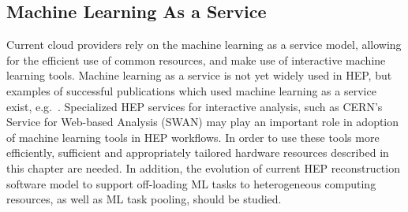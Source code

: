 \subsection{Machine Learning As a Service}
Current cloud providers rely on the machine learning as a service model, allowing for the efficient use of common resources, and make use of interactive machine learning tools. Machine learning as a service is not yet widely used in HEP, but examples of successful publications which used machine learning as a service exist, e.g.~\cite{Aaij:2014azz}. Specialized HEP services for interactive analysis, such as CERN's Service for Web-based Analysis (SWAN) may play an important role in adoption of machine learning tools in HEP workflows. In order to use these tools more efficiently, sufficient and appropriately tailored hardware resources  described in this chapter are needed.
In addition, the evolution of current HEP reconstruction software model to support off-loading ML tasks to heterogeneous computing resources, as well as ML task pooling, should be studied.



